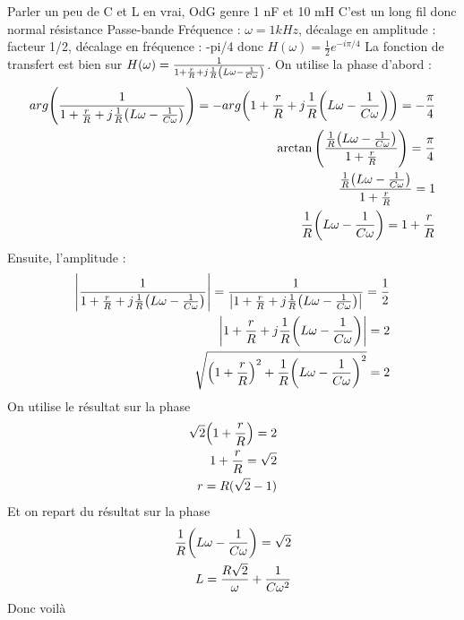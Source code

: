 \begin{solution}

\begin{questions}
    \questioncours Parler un peu de C et L en vrai, OdG genre 1 nF et 10 mH
    \question C'est un long fil donc normal résistance
    \question Passe-bande
    \question Fréquence : $\omega = 1 kHz$, décalage en amplitude : facteur 1/2, décalage en fréquence : -pi/4 donc $H(\omega) = \frac12e^{-i\pi/4}$
    \question La fonction de transfert est bien sur $H(\omega) = \frac1{1+\frac{r}R + j\frac1R\qty(L\omega-\frac{1}{C\omega})}$. On utilise la phase d'abord : 
    \begin{align*}
    arg\qty(\frac1{1+\frac{r}R + j\frac1R\qty(L\omega-\frac{1}{C\omega})}) = -arg\qty( 1+\frac{r}R + j\frac1R\qty(L\omega-\frac{1}{C\omega}) ) = -\frac{\pi}4 \\
    \arctan\qty(\frac{\frac1R\qty(L\omega-\frac{1}{C\omega})}{1+\frac{r}R}) = \frac{\pi}4 \\
    \frac{\frac1R\qty(L\omega-\frac{1}{C\omega})}{1+\frac{r}R} = 1 \\
    \frac1R\qty(L\omega-\frac{1}{C\omega}) = 1+\frac{r}R
    \end{align*}
    Ensuite, l'amplitude :
    \begin{align*}
    \abs{\frac1{1+\frac{r}R + j\frac1R\qty(L\omega-\frac{1}{C\omega})}} = \frac1{\abs{1+\frac{r}R + j\frac1R\qty(L\omega-\frac{1}{C\omega})}} = \frac12\\
    \abs{1+\frac{r}R + j\frac1R\qty(L\omega-\frac{1}{C\omega})} = 2 \\
    \sqrt{\qty(1+\frac{r}R)^2 + \frac1R\qty(L\omega-\frac{1}{C\omega})^2} = 2
    \end{align*}
    On utilise le résultat sur la phase
    \begin{align*}
    \sqrt{2}\qty(1+\frac{r}R) = 2 \\
    1+\frac{r}R = \sqrt{2} \\
    r = R(\sqrt{2} -1)
    \end{align*}
    Et on repart du résultat sur la phase
    \begin{align*}
    \frac1R\qty(L\omega-\frac{1}{C\omega}) = \sqrt{2} \\
    L = \frac{R\sqrt{2}}{\omega} + \frac1{C\omega^2}
    \end{align*}
    Donc voilà
    
\end{questions}

\end{solution}
